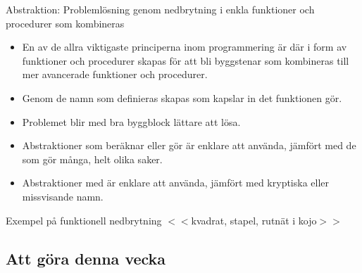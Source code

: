 \begin{Slide}{Abstraktion: Problemlösning genom nedbrytning i enkla funktioner och procedurer som kombineras}\SlideFontSmall
\begin{itemize}
\item En av de allra viktigaste principerna inom programmering är  där   i form av funktioner och procedurer skapas för att bli byggstenar som kombineras till mer avancerade funktioner och procedurer.

\item Genom de namn som definieras skapas  som kapslar in det funktionen gör. 

\item Problemet blir med bra byggblock lättare att lösa.

\item Abstraktioner som beräknar eller gör  är enklare att använda, jämfört med de som gör många, helt olika saker.

\item Abstraktioner med  är enklare att använda, jämfört med kryptiska eller missvisande namn.
\end{itemize}

\end{Slide}

\begin{Slide}{Exempel på funktionell nedbrytning}
$<<$kvadrat, stapel, rutnät i kojo$>>$ 
\end{Slide}
\subsection{Att göra denna vecka}










